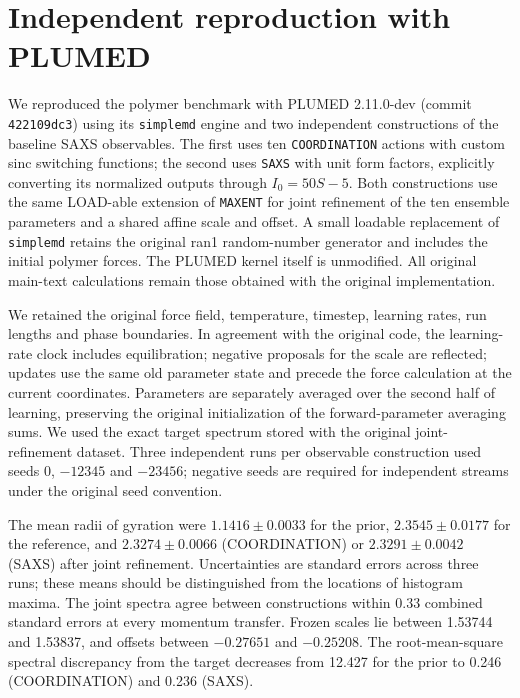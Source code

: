 \section{Independent reproduction with PLUMED}
We reproduced the polymer benchmark with PLUMED 2.11.0-dev
(commit \texttt{422109dc3}) using its \texttt{simplemd} engine and two
independent constructions of the baseline SAXS observables. The first uses
ten \texttt{COORDINATION} actions with custom sinc switching functions;
the second uses \texttt{SAXS} with unit form factors, explicitly converting
its normalized outputs through $I_0=50S-5$. Both constructions use the same
LOAD-able extension of \texttt{MAXENT} for joint refinement of the ten
ensemble parameters and a shared affine scale and offset. A small loadable
replacement of \texttt{simplemd} retains the original ran1 random-number
generator and includes the initial polymer forces. The PLUMED kernel itself
is unmodified. All original main-text calculations remain those obtained
with the original implementation.

We retained the original force field, temperature, timestep, learning rates,
run lengths and phase boundaries. In agreement with the original code, the
learning-rate clock includes equilibration; negative proposals for the scale
are reflected; updates use the same old parameter state and precede the
force calculation at the current coordinates. Parameters are separately
averaged over the second half of learning, preserving the original initialization
of the forward-parameter averaging sums. We used the exact target spectrum
stored with the original joint-refinement dataset. Three independent runs per
observable construction used seeds 0, $-12345$ and $-23456$; negative seeds
are required for independent streams under the original seed convention.

The mean radii of gyration were $1.1416\pm0.0033$ for the prior,
$2.3545\pm0.0177$ for the reference, and $2.3274\pm0.0066$ (COORDINATION)
or $2.3291\pm0.0042$ (SAXS) after joint refinement. Uncertainties are standard
errors across three runs; these means should be distinguished from the
locations of histogram maxima. The joint spectra agree between constructions
within $0.33$ combined standard errors at every momentum transfer. Frozen
scales lie between 1.53744 and 1.53837, and offsets between $-0.27651$ and
$-0.25208$. The root-mean-square spectral discrepancy from the target decreases
from 12.427 for the prior to 0.246 (COORDINATION) and 0.236 (SAXS).

